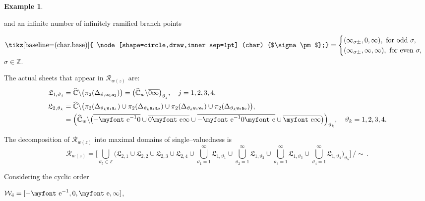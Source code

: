 \documentclass[final,3p,times]{elsarticle}
\newcommand{\ZZ}{\ensuremath{{\mathbb Z}}}
\newcommand{\CW}{\ensuremath{{\widehat{\mathbb C}}}}
\newcommand{\R}{\ensuremath{{\mathcal R}}}
\newcommand{\e}{{\text{\myfont e}}}
\newcommand{\circled}[1]{ \text{\tikz[baseline=(char.base)]{
    \node[shape=circle,draw,inner sep=1pt] (char) {$#1$};}} }
\theoremstyle{definition}
\newtheorem{example}{Example}[section]
\begin{document}
\begin{example}
\begin{enumerate}[label=\alph*),leftmargin=*]
\noindent
and an infinite number of infinitely ramified branch points 

\centerline{
$\circled{\sigma\pm }= \begin{cases} (\infty_{\sigma\pm}, 0, \infty), \text{ for odd } \sigma,\\
(\infty_{\sigma\pm}, \infty, \infty), \text{ for even } \sigma, \end{cases}$ $\sigma \in \ZZ.$
}

\noindent
The actual sheets that appear in $\R_{w(z)}$ are:
\begin{align*}
\mathfrak{L}_{1,\vartheta_j} &= \CW\backslash \big( \pi_2 (\Delta_{\vartheta_j {\tt a}_1 {\tt a}_2}  ) \big)
= \big( \CW_w \backslash  \overline{0 \infty} \big)_{\vartheta_j}, \quad j=1,2,3,4,
\\
%
\mathfrak{L}_{2,\vartheta_k} &= \CW\backslash \big( 
\pi_2 (\Delta_{\vartheta_k {\tt w}_1 {\tt a}_1} ) \cup 
\pi_2 (\Delta_{\vartheta_k {\tt a}_1{\tt a}_2} ) \cup
\pi_2 (\Delta_{\vartheta_k {\tt w}_1 {\tt w}_2} ) \cup
\pi_2 (\Delta_{\vartheta_k {\tt w}_2 {\tt a}_2} ) 
\big),
\\
&= \Big( \CW_w \backslash  \big(
\overline{-\e^{-1} 0 } \cup
\overline{0 \e \infty } \cup
\overline{-\e^{-1} 0 \e } \cup 
\overline{\e \infty }
\big)
\Big)_{\vartheta_k} , \quad \vartheta_k=1,2,3,4.
\end{align*}

\noindent
The decomposition of $\R_{w(z)}$ into maximal domains of single--valuedness is 
\begin{equation*}
\R_{w(z)} = 
\Bigg[
\bigcup_{\vartheta_5 \in\ZZ} \bigg( 
\mathfrak{L}_{2,1} \cup \mathfrak{L}_{2,2}
\cup \mathfrak{L}_{2,3} \cup \mathfrak{L}_{2,4}
\cup
\bigcup_{\vartheta_1= 1}^\infty 
\mathfrak{L}_{1, \vartheta_1}
\cup
\bigcup_{\vartheta_2= 1}^\infty 
\mathfrak{L}_{1, \vartheta_2 }
\cup
\bigcup_{\vartheta_3= 1}^\infty 
\mathfrak{L}_{1, \vartheta_3}
\cup
\bigcup_{\vartheta_4= 1}^\infty 
\mathfrak{L}_{1, \vartheta_4 }
\bigg)_{\vartheta_5}
\Bigg]
\, \Bigg/ \sim \, .
\end{equation*}


Considering the cyclic order 

\centerline{$\mathcal{W}_4 = [ -\e^{-1}, 0, \e, \infty ]$,}


\end{enumerate}
\end{example}
\end{document}
